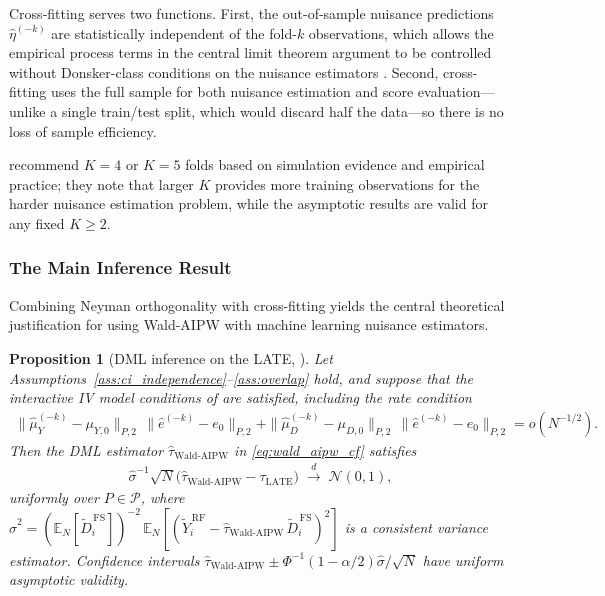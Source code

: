 \documentclass[12pt,a4paper]{article}
\newtheorem{proposition}{Proposition}
\newcommand{\En}{\mathbb{E}_N}
\begin{document}
Cross-fitting serves two functions. First, the out-of-sample nuisance predictions
$\hat\eta^{(-k)}$ are statistically independent of the fold-$k$ observations, which
allows the empirical process terms in the central limit theorem argument to be controlled
without Donsker-class conditions on the nuisance estimators
\citep[p.~C8]{chernozhukov2018double}. Second, cross-fitting uses the full sample for
both nuisance estimation and score evaluation---unlike a single train/test split, which
would discard half the data---so there is no loss of sample efficiency.
 
\citet[Remark~3.1, p.~C24]{chernozhukov2018double} recommend $K = 4$ or $K = 5$ folds
based on simulation evidence and empirical practice; they note that larger $K$ provides
more training observations for the harder nuisance estimation problem, while the
asymptotic results are valid for any fixed $K \geq 2$.
 
\subsubsection{The Main Inference Result}
\label{subsubsec:wald_aipw_theorem}
 
Combining Neyman orthogonality with cross-fitting yields the central theoretical
justification for using Wald-AIPW with machine learning nuisance estimators.
 
\begin{proposition}[DML inference on the LATE, \citealp{chernozhukov2018double}]
\label{prop:wald_aipw_clt}
Let Assumptions~\ref{ass:ci_independence}--\ref{ass:overlap} hold, and suppose that the
interactive IV model conditions of \citet[Assumption~5.2]{chernozhukov2018double} are
satisfied, including the rate condition
\begin{align}
    \|\hat\mu_Y^{(-k)} - \mu_{Y,0}\|_{P,2}\,
    \|\hat e^{(-k)} - e_0\|_{P,2}
    +
    \|\hat\mu_D^{(-k)} - \mu_{D,0}\|_{P,2}\,
    \|\hat e^{(-k)} - e_0\|_{P,2}
    = o(N^{-1/2}).
    \label{eq:wald_aipw_rate}
\end{align}
Then the DML estimator $\hat\tau_{\mathrm{Wald\text{-}AIPW}}$ in \eqref{eq:wald_aipw_cf}
satisfies
\begin{align}
    \hat\sigma^{-1}\sqrt{N}
    \bigl(\hat\tau_{\mathrm{Wald\text{-}AIPW}} - \tau_{\mathrm{LATE}}\bigr)
    \;\xrightarrow{d}\;
    \mathcal{N}(0,1),
    \label{eq:wald_aipw_clt}
\end{align}
uniformly over $P \in \mathcal{P}$, where
$\hat\sigma^2 = (\En[\widetilde{D}^{\,\mathrm{FS}}_i])^{-2}\,
\En[(\widetilde{Y}^{\,\mathrm{RF}}_i - \hat\tau_{\mathrm{Wald\text{-}AIPW}}\,
\widetilde{D}^{\,\mathrm{FS}}_i)^2]$ is a consistent variance estimator.
Confidence intervals $\hat\tau_{\mathrm{Wald\text{-}AIPW}} \pm
\Phi^{-1}(1-\alpha/2)\hat\sigma/\sqrt{N}$ have uniform asymptotic validity.
\end{proposition}
 
\end{document}
